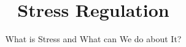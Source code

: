 \graphicspath{{images/}} %


\title[Stress regulation]{Stress Regulation} %
\subtitle{What is Stress and What can We do about It?}








 \begin{frame}
\titlepage %
\end{frame}

\maketitle





